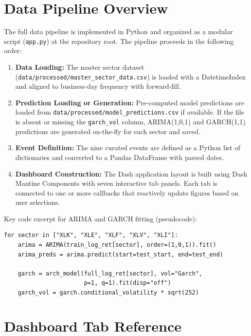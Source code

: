 \documentclass[12pt]{article}
\begin{document}
\newpage

\appendix
\section{Data Pipeline Overview}

The full data pipeline is implemented in Python and organized as a modular script (\texttt{app.py}) at the repository root. The pipeline proceeds in the following order:

\begin{enumerate}
    \item \textbf{Data Loading:} The master sector dataset (\texttt{data/processed/master\_sector\_data.csv}) is loaded with a DatetimeIndex and aligned to business-day frequency with forward-fill.
    \item \textbf{Prediction Loading or Generation:} Pre-computed model predictions are loaded from \texttt{data/processed/model\_predictions.csv} if available. If the file is absent or missing the \texttt{garch\_vol} column, ARIMA(1,0,1) and GARCH(1,1) predictions are generated on-the-fly for each sector and saved.
    \item \textbf{Event Definition:} The nine curated events are defined as a Python list of dictionaries and converted to a Pandas DataFrame with parsed dates.
    \item \textbf{Dashboard Construction:} The Dash application layout is built using Dash Mantine Components with seven interactive tab panels. Each tab is connected to one or more callbacks that reactively update figures based on user selections.
\end{enumerate}

\noindent Key code excerpt for ARIMA and GARCH fitting (pseudocode):
\begin{verbatim}
for sector in ["XLK", "XLE", "XLF", "XLV", "XLI"]:
    arima = ARIMA(train_log_ret[sector], order=(1,0,1)).fit()
    arima_preds = arima.predict(start=test_start, end=test_end)

    garch = arch_model(full_log_ret[sector], vol="Garch",
                       p=1, q=1).fit(disp="off")
    garch_vol = garch.conditional_volatility * sqrt(252)
\end{verbatim}

\section{Dashboard Tab Reference}
\end{document}

